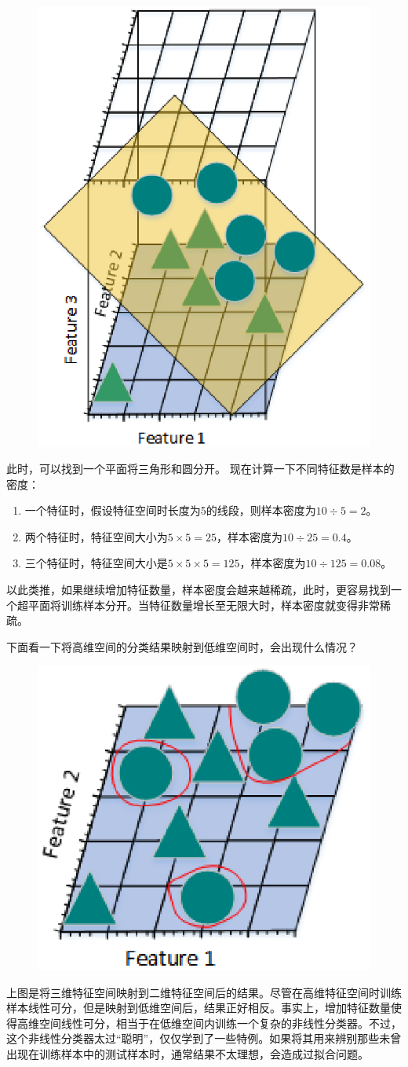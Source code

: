  \begin{figure}[h]
   \centering
   \includegraphics[width=.3\textwidth]{imgs/2.21.1.4.eps}
 \end{figure}

此时，可以找到一个平面将三角形和圆分开。 现在计算一下不同特征数是样本的密度：

\begin{enumerate}\itemsep0em
		\item 一个特征时，假设特征空间时长度为5的线段，则样本密度为$10 \div 5 = 2$。
		\item 两个特征时，特征空间大小为$ 5\times5 = 25$，样本密度为$10 \div 25 = 0.4$。
		\item 三个特征时，特征空间大小是$ 5\times5\times5 = 125$，样本密度为$10 \div 125 = 0.08$。
\end{enumerate}

以此类推，如果继续增加特征数量，样本密度会越来越稀疏，此时，更容易找到一个超平面将训练样本分开。当特征数量增长至无限大时，样本密度就变得非常稀疏。

下面看一下将高维空间的分类结果映射到低维空间时，会出现什么情况？

 \begin{figure}[h]
   \centering
   \includegraphics[width=.5\textwidth]{imgs/2.21.1.5.eps}
 \end{figure}

上图是将三维特征空间映射到二维特征空间后的结果。尽管在高维特征空间时训练样本线性可分，但是映射到低维空间后，结果正好相反。事实上，增加特征数量使得高维空间线性可分，相当于在低维空间内训练一个复杂的非线性分类器。不过，这个非线性分类器太过``聪明''，仅仅学到了一些特例。如果将其用来辨别那些未曾出现在训练样本中的测试样本时，通常结果不太理想，会造成过拟合问题。

